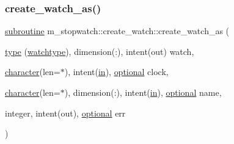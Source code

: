 \subsubsection{\texorpdfstring{create\+\_\+watch\+\_\+as()}{create\_watch\_as()}}
{\footnotesize\ttfamily \hyperlink{M__stopwatch_83_8txt_acfbcff50169d691ff02d4a123ed70482}{subroutine} m\+\_\+stopwatch\+::create\+\_\+watch\+::create\+\_\+watch\+\_\+as (\begin{DoxyParamCaption}\item[{\hyperlink{stop__watch_83_8txt_a70f0ead91c32e25323c03265aa302c1c}{type} (\hyperlink{structm__stopwatch_1_1watchtype}{watchtype}), dimension(\+:), intent(out)}]{watch,  }\item[{\hyperlink{option__stopwatch_83_8txt_abd4b21fbbd175834027b5224bfe97e66}{character}(len=$\ast$), intent(\hyperlink{M__journal_83_8txt_afce72651d1eed785a2132bee863b2f38}{in}), \hyperlink{option__stopwatch_83_8txt_aa4ece75e7acf58a4843f70fe18c3ade5}{optional}}]{clock,  }\item[{\hyperlink{option__stopwatch_83_8txt_abd4b21fbbd175834027b5224bfe97e66}{character}(len=$\ast$), dimension(\+:), intent(\hyperlink{M__journal_83_8txt_afce72651d1eed785a2132bee863b2f38}{in}), \hyperlink{option__stopwatch_83_8txt_aa4ece75e7acf58a4843f70fe18c3ade5}{optional}}]{name,  }\item[{integer, intent(out), \hyperlink{option__stopwatch_83_8txt_aa4ece75e7acf58a4843f70fe18c3ade5}{optional}}]{err }\end{DoxyParamCaption})\hspace{0.3cm}{\ttfamily [private]}}

\mbox{\label{interfacem__stopwatch_1_1create__watch_a4aedfa5908a415450b0633bf8e2e4d08}} 
